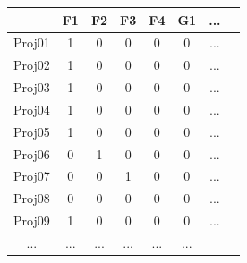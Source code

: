 \documentclass[8pt]{beamer}
\begin{document}
\begin{frame}[fragile]
\begin{columns}[c]
\begin{minipage}[c][.5\textheight][c]{\linewidth}
{\centering
\tiny
\setlength{\tabcolsep}{1pt}
\begin{table}
\begin{tabular}{c|ccccccc}
\bottomrule
	   &F1  & F2 & F3 & F4 & G1 & ...   \\
\hline
Proj01 & 1  & 0  & 0  & 0  & 0 & ...\\
Proj02 & 1  & 0  & 0  & 0  & 0 & ...\\
Proj03 & 1  & 0  & 0  & 0  & 0 & ...\\
Proj04 & 1  & 0  & 0  & 0  & 0 & ...\\
Proj05 & 1  & 0  & 0  & 0  & 0 & ...\\
Proj06 & 0  & 1  & 0  & 0  & 0 & ...\\
Proj07 & 0  & 0  & 1  & 0  & 0 & ...\\
Proj08 & 0  & 0  & 0  & 0  & 0 & ...\\
Proj09 & 1  & 0  & 0  & 0  & 0 & ...\\
... &  ...  & ...  & ...  & ... & ... \\
\end{tabular}
\end{table}

}





\end{minipage}
\end{columns}
\end{frame}
\end{document}
